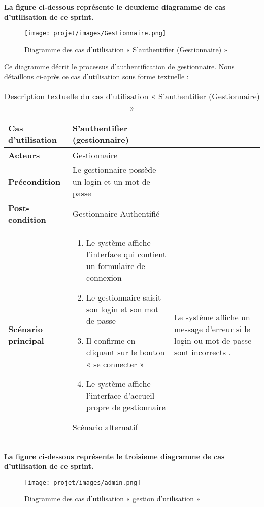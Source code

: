 \textbf {La figure ci-dessous représente le deuxieme  diagramme de cas d’utilisation de ce sprint.}\\

\begin{figure}[H]
    \centering
    \texttt{[image: projet/images/Gestionnaire.png]}
    \caption{Diagramme des cas d’utilisation « S’authentifier (Gestionnaire) »}
    \label{fig:equipe_scrum}
\end{figure}

Ce diagramme décrit le processus d’authentification de gestionnaire. Nous détaillons ci-après ce cas d’utilisation sous forme textuelle :
\

\begin{longtable}{|>{\bfseries}p{4cm}|p{10cm}|}
\hline
Cas d’utilisation &  S’authentifier (gestionnaire)  \\
\hline
Acteurs & Gestionnaire \\
\hline
Précondition & Le gestionnaire possède un login et un mot de passe\\
\hline
Post-condition & Gestionnaire Authentifié\\
\hline
Scénario principal & 
\begin{enumerate}
  \item  Le système affiche l’interface qui contient un formulaire
de connexion

  \item Le gestionnaire saisit son login et son mot de passe

  \item Il confirme en cliquant sur le bouton « se connecter »
  \item Le système affiche l’interface d’accueil propre de gestionnaire
\end{enumerate} 
\hline
Scénario alternatif & Le système affiche un message d’erreur si le login ou mot de
passe sont incorrects .
 \hline
\caption{Description textuelle du cas d’utilisation « S’authentifier (Gestionnaire)  »}
\end{longtable}


\textbf {La figure ci-dessous représente le troisieme  diagramme de cas d’utilisation de ce sprint.}

\begin{figure}[H]
    \centering
    \texttt{[image: projet/images/admin.png]}
    \caption{Diagramme des cas d’utilisation « gestion d'utilisation »}
    \label{fig:equipe_scrum}
\end{figure}

